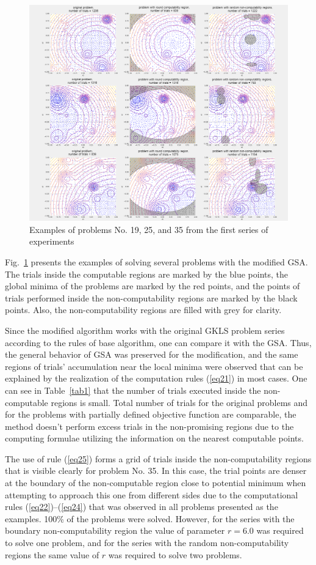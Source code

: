 \documentclass[runningheads]{llncs}
\begin{document}
\begin{figure}[h]
\includegraphics[width=\textwidth]{fig6.png}
\caption{Examples of problems No. 19, 25, and 35 from the first series of experiments} \label{fig6}
\end{figure}

Fig.~\ref{fig6} presents the examples of solving several problems with the modified GSA. The trials inside the computable regions are marked by the blue points, the global minima of the problems are marked by the red points, and the points of trials performed inside the non-computability regions are marked by the black points. Also, the non-computability regions are filled with grey for clarity.

Since the modified algorithm works with the original GKLS problem series according to the rules of base algorithm, one can compare it with the GSA. Thus, the general behavior of GSA was preserved for the modification, and the same regions of trials' accumulation near the local minima were observed that can be explained by the realization of the  computation rules (\ref{eq21}) in most cases. One can see in Table~\ref{tab1} that the number of trials executed inside the non-computable regions is small. Total number of trials for the original problems and for the problems with partially defined objective function are comparable, the method doesn't perform excess trials in the non-promising regions due to the computing formulae utilizing the information on the nearest computable points.

The use of rule (\ref{eq25}) forms a grid of trials inside the non-computability regions that is visible clearly for problem No. 35. In this case, the trial points are denser at the boundary of the non-computable region close to potential minimum when attempting to approach this one from different sides due to the computational rules (\ref{eq22})--(\ref{eq24}) that was observed in all problems presented as the examples. 
100\% of the problems were solved. However, for the series with the boundary non-computability region the value of parameter $r=6.0$ was required to solve one problem, and for the series with the random non-computability regions the same value of $r$ was required to solve two problems.
\end{document}
